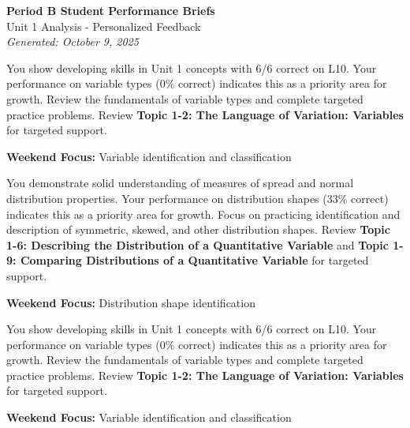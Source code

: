 \documentclass[11pt]{article}
\begin{document}
\begin{center}
{\LARGE \textbf{Period B Student Performance Briefs}}\\[0.05in]
{\large Unit 1 Analysis - Personalized Feedback}\\[0.05in]
\textit{Generated: October 9, 2025}
\end{center}

\vspace{0.15in}

\begin{tcolorbox}[colback=green!5!white,colframe=green!75!black,title=\textbf{Edgar} (apple\_monkey) - L10: 6/6 (100\%)]
You show developing skills in Unit 1 concepts with 6/6 correct on L10. Your performance on variable types (0\% correct) indicates this as a priority area for growth. Review the fundamentals of variable types and complete targeted practice problems. Review \textbf{Topic 1-2: The Language of Variation: Variables} for targeted support.

\vspace{0.1in}
\textbf{Weekend Focus:} Variable identification and classification
\end{tcolorbox}

\vspace{0.15in}

\begin{tcolorbox}[colback=green!5!white,colframe=green!75!black,title=\textbf{Ana} (papaya\_eagle) - L10: 5/6 (83\%)]
You demonstrate solid understanding of measures of spread and normal distribution properties. Your performance on distribution shapes (33\% correct) indicates this as a priority area for growth. Focus on practicing identification and description of symmetric, skewed, and other distribution shapes. Review \textbf{Topic 1-6: Describing the Distribution of a Quantitative Variable} and \textbf{Topic 1-9: Comparing Distributions of a Quantitative Variable} for targeted support.

\vspace{0.1in}
\textbf{Weekend Focus:} Distribution shape identification
\end{tcolorbox}

\vspace{0.15in}

\begin{tcolorbox}[colback=green!5!white,colframe=green!75!black,title=\textbf{Francois} (apricot\_horse) - L10: 6/6 (100\%)]
You show developing skills in Unit 1 concepts with 6/6 correct on L10. Your performance on variable types (0\% correct) indicates this as a priority area for growth. Review the fundamentals of variable types and complete targeted practice problems. Review \textbf{Topic 1-2: The Language of Variation: Variables} for targeted support.

\vspace{0.1in}
\textbf{Weekend Focus:} Variable identification and classification
\end{tcolorbox}
\end{document}
